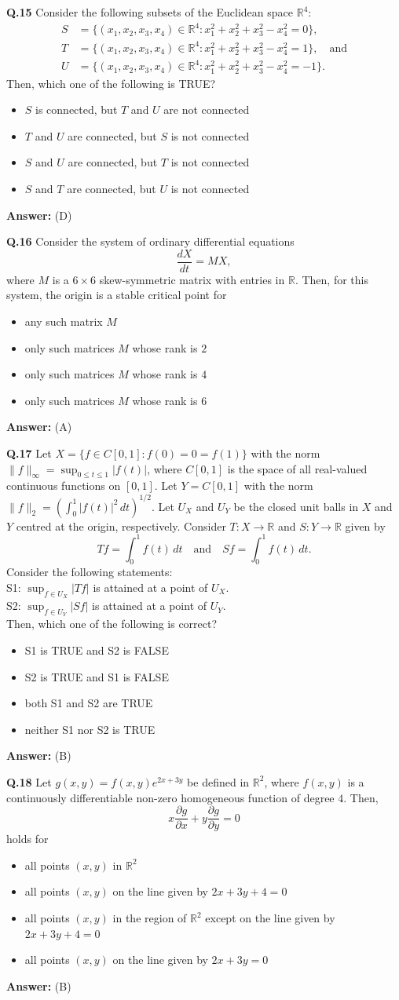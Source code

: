 \documentclass[11pt,a4paper]{article}
\newcommand{\optslistA}[4]{%
  \begin{itemize}
    \setlength{\itemsep}{2pt}\setlength{\parskip}{0pt}
    \item[(A)] #1
    \item[(B)] #2
    \item[(C)] #3
    \item[(D)] #4
  \end{itemize}%
}
\newcommand{\ans}[1]{\textbf{Answer:} #1\par\medskip}
\begin{document}
\textbf{Q.15} Consider the following subsets of the Euclidean space $\mathbb{R}^4$:
\begin{align*}
  S &= \{(x_1, x_2, x_3, x_4) \in \mathbb{R}^4 : x_1^2 + x_2^2 + x_3^2 - x_4^2 = 0\}, \\
  T &= \{(x_1, x_2, x_3, x_4) \in \mathbb{R}^4 : x_1^2 + x_2^2 + x_3^2 - x_4^2 = 1\}, \quad \text{and} \\
  U &= \{(x_1, x_2, x_3, x_4) \in \mathbb{R}^4 : x_1^2 + x_2^2 + x_3^2 - x_4^2 = -1\}.
\end{align*}
Then, which one of the following is TRUE?
\optslistA{$S$ is connected, but $T$ and $U$ are not connected}{$T$ and $U$ are connected, but $S$ is not connected}{$S$ and $U$ are connected, but $T$ is not connected}{$S$ and $T$ are connected, but $U$ is not connected}
\ans{(D)}

\textbf{Q.16} Consider the system of ordinary differential equations
\[
  \frac{dX}{dt} = MX,
\]
where $M$ is a $6 \times 6$ skew-symmetric matrix with entries in $\mathbb{R}$. Then, for this system, the origin is a stable critical point for
\optslistA{any such matrix $M$}{only such matrices $M$ whose rank is $2$}{only such matrices $M$ whose rank is $4$}{only such matrices $M$ whose rank is $6$}
\ans{(A)}

\textbf{Q.17} Let $X = \{f \in C[0, 1] : f(0) = 0 = f(1)\}$ with the norm $\|f\|_\infty = \sup_{0 \le t \le 1} |f(t)|$, where $C[0, 1]$ is the space of all real-valued continuous functions on $[0, 1]$. Let $Y = C[0, 1]$ with the norm $\|f\|_2 = (\int_0^1 |f(t)|^2\,dt)^{1/2}$. Let $U_X$ and $U_Y$ be the closed unit balls in $X$ and $Y$ centred at the origin, respectively. Consider $T : X \to \mathbb{R}$ and $S : Y \to \mathbb{R}$ given by
\[
  Tf = \int_0^1 f(t)\,dt \quad \text{and} \quad Sf = \int_0^1 f(t)\,dt.
\]
Consider the following statements:\\
S1: $\sup_{f \in U_X} |Tf|$ is attained at a point of $U_X$.\\
S2: $\sup_{f \in U_Y} |Sf|$ is attained at a point of $U_Y$.\\
Then, which one of the following is correct?
\optslistA{S1 is TRUE and S2 is FALSE}{S2 is TRUE and S1 is FALSE}{both S1 and S2 are TRUE}{neither S1 nor S2 is TRUE}
\ans{(B)}

\textbf{Q.18} Let $g(x, y) = f(x, y) e^{2x+3y}$ be defined in $\mathbb{R}^2$, where $f(x, y)$ is a continuously differentiable non-zero homogeneous function of degree $4$. Then,
\[
  x \frac{\partial g}{\partial x} + y \frac{\partial g}{\partial y} = 0
\]
holds for
\optslistA{all points $(x, y)$ in $\mathbb{R}^2$}{all points $(x, y)$ on the line given by $2x + 3y + 4 = 0$}{all points $(x, y)$ in the region of $\mathbb{R}^2$ except on the line given by $2x + 3y + 4 = 0$}{all points $(x, y)$ on the line given by $2x + 3y = 0$}
\ans{(B)}
\end{document}
